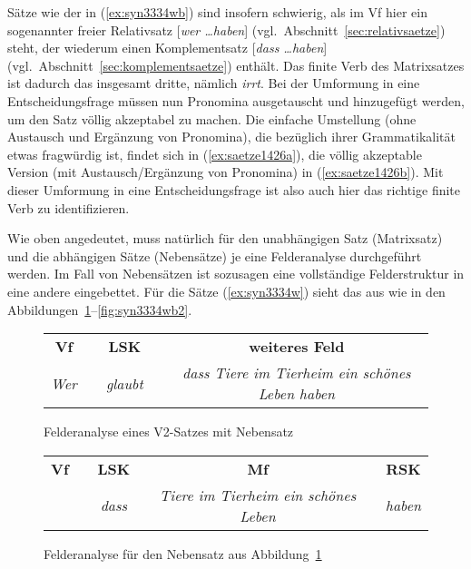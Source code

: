 Sätze wie der in (\ref{ex:syn3334wb}) sind insofern schwierig, als im Vf hier ein sogenannter freier Relativsatz [\textit{wer \ldots haben}] (vgl.\ Abschnitt~\ref{sec:relativsaetze}) steht, der wiederum einen Komplementsatz [\textit{dass \ldots haben}] (vgl.\ Abschnitt~\ref{sec:komplementsaetze}) enthält.
Das finite Verb des Matrixsatzes ist dadurch das insgesamt dritte, nämlich \textit{irrt}.
Bei der Umformung in eine Entscheidungsfrage müssen nun Pronomina ausgetauscht und hinzugefügt werden, um den Satz völlig akzeptabel zu machen.
Die einfache Umstellung (ohne Austausch und Ergänzung von Pronomina), die bezüglich ihrer Grammatikalität etwas fragwürdig ist, findet sich in (\ref{ex:saetze1426a}), die völlig akzeptable Version (mit Austausch\slash Ergänzung von Pronomina) in (\ref{ex:saetze1426b}).
Mit dieser Umformung in eine Entscheidungsfrage ist also auch hier das richtige finite Verb zu identifizieren.

\begin{exe}
  \ex\label{ex:saetze1426}
  \begin{xlist}
  \end{xlist}
\end{exe}

Wie oben angedeutet, muss natürlich für den unabhängigen Satz (Matrixsatz) und die abhängigen Sätze (Nebensätze) je eine Felderanalyse durchgeführt werden.
Im Fall von Nebensätzen ist sozusagen eine vollständige Felderstruktur in eine andere eingebettet.
Für die Sätze (\ref{ex:syn3334w}) sieht das aus wie in den Abbildungen~\ref{fig:syn3334wa1}--\ref{fig:syn3334wb2}.

\begin{figure}
  \centering
  \begin{tabular}{cp{0.1em}cp{0.1em}c}
    \textbf{Vf} && \textbf{LSK} && \textbf{weiteres Feld} \\
    \cmidrule{1-1}\cmidrule{3-3}\cmidrule{5-5}
    \textit{Wer} && \textit{glaubt} && \textit{dass Tiere im Tierheim ein schönes Leben haben} \\
  \end{tabular}
  \caption{Felderanalyse eines V2-Satzes mit Nebensatz}
  \label{fig:syn3334wa1}
\end{figure}

\begin{figure}
  \centering
  \begin{tabular}{cp{0.1em}cp{0.1em}cp{0.1em}c}
    \textbf{Vf} && \textbf{LSK} && \textbf{Mf} && \textbf{RSK} \\
    \cmidrule{1-1}\cmidrule{3-3}\cmidrule{5-5}\cmidrule{7-7}
    && \textit{dass} && \textit{Tiere im Tierheim ein schönes Leben} && \textit{haben} \\
  \end{tabular}
  \caption{Felderanalyse für den Nebensatz aus Abbildung~\ref{fig:syn3334wa1}}
  \label{fig:syn3334wa2}
\end{figure}

